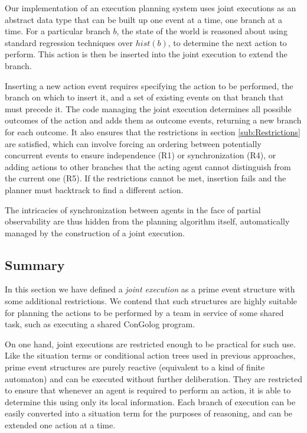 Our implementation of an execution planning system uses joint executions
as an abstract data type that can be built up one event at a time,
one branch at a time. For a particular branch $b$, the state of the
world is reasoned about using standard regression techniques over
$hist(b)$, to determine the next action to perform. This action is
then be inserted into the joint execution to extend the branch.

Inserting a new action event requires specifying the action to be
performed, the branch on which to insert it, and a set of existing
events on that branch that must precede it. The code managing the
joint execution determines all possible outcomes of the action and
adds them as outcome events, returning a new branch for each outcome.
It also ensures that the restrictions in section \ref{sub:Restrictions}
are satisfied, which can involve forcing an ordering between potentially
concurrent events to ensure independence (R1) or synchronization (R4),
or adding actions to other branches that the acting agent cannot distinguish
from the current one (R5). If the restrictions cannot be met, insertion
fails and the planner must backtrack to find a different action.

The intricacies of synchronization between agents in the face of partial
observability are thus hidden from the planning algorithm itself,
automatically managed by the construction of a joint execution.


\subsection{Summary}

In this section we have defined a \emph{joint execution} as a prime
event structure with some additional restrictions. We contend that
such structures are highly suitable for planning the actions to be
performed by a team in service of some shared task, such as executing
a shared ConGolog program. 

On one hand, joint executions are restricted enough to be practical
for such use. Like the situation terms or conditional action trees
used in previous approaches, prime event structures are purely reactive
(equivalent to a kind of finite automaton) and can be executed without
further deliberation. They are restricted to ensure that whenever
an agent is required to perform an action, it is able to determine
this using only its local information. Each branch of execution can
be easily converted into a situation term for the purposes of reasoning,
and can be extended one action at a time.

